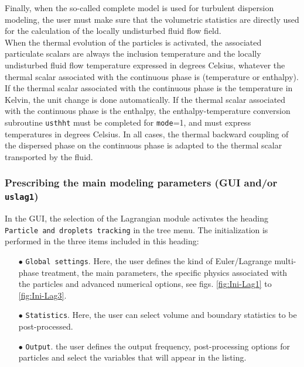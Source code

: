 {{Finally, when the so-called complete model is used for turbulent dispersion modeling, the user must make sure that the volumetric statistics are directly used for the calculation of the locally undisturbed fluid flow field.\\ 

When the thermal evolution of the particles is activated, the associated particulate scalars are always the inclusion temperature and the locally undisturbed fluid flow temperature expressed in degrees Celsius, whatever the thermal scalar associated with the continuous phase is (temperature or enthalpy). If the
thermal scalar associated with the continuous phase is the temperature in Kelvin, the unit change is done automatically. If the thermal scalar associated with the continuous phase is the enthalpy, the enthalpy-temperature conversion subroutine \texttt{usthht} must be completed for \texttt{mode}=1, and must express temperatures in degrees Celsius. In all cases, the thermal backward coupling of the dispersed phase on the continuous phase is adapted to the thermal scalar transported by the fluid.


\subsubsection{Prescribing the main modeling parameters (GUI and/or \texttt{uslag1})}\label{sec:Ini-lag}


In the GUI, the selection of the Lagrangian module activates the heading \texttt{Particle and droplets tracking} in the tree menu. The initialization is performed in the three items included in this heading:
%
\begin{itemize}
 \item [$\bullet$] \texttt{Global settings}. Here, the user defines the kind of Euler/Lagrange multi-phase treatment, the main parameters, the specific physics associated with the particles and advanced numerical options, see figs. \ref {fig:Ini-Lag1} to \ref {fig:Ini-Lag3}.
 \item [$\bullet$] \texttt{Statistics}. Here, the user can select volume and boundary statistics to be post-processed.
 \item [$\bullet$] \texttt{Output}. the user defines the output frequency, post-processing options for particles and select the variables that will appear in the listing.
\end{itemize}

}}
